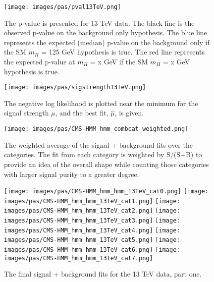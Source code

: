 \begin{figure}[h!]
    \centering
    \texttt{[image: images/pas/pval13TeV.png]}
    \caption[The p-value on the background-only hypothesis using 13 TeV data alone.]
    {The p-value is presented for 13 TeV data. The black line is the observed p-value on the background only hypothesis. The blue line represents the expected (median) p-value on the background only if the SM $m_H$ = 125 GeV hypothesis is true. The red line represents the expected p-value at $m_H$ = x GeV if the SM $m_H$ = x GeV hypothesis is true.}
    \label{fig:pval13}
\end{figure}
\begin{figure}[h!]
    \centering
    \texttt{[image: images/pas/sigstrength13TeV.png]}
    \caption[A plot of the negative log likelihood near the minimum for the signal strength.]
    {The negative log likelihood is plotted near the minimum for the signal strength $\mu$, and the best fit, $\hat{\mu}$, is given.}
    \label{fig:signalstrength13}
\end{figure}
\begin{figure}[h!]
    \centering
    \texttt{[image: images/pas/CMS-HMM\_hmm\_combcat\_weighted.png]}
    \caption[The weighted average of the signal + background fits for 13 TeV data.]
    {The weighted average of the signal + background fits over the categories. The fit from each category is weighted by S/(S+B) to provide an idea of the overall shape while counting those categories with larger signal purity to a greater degree.}
    \label{fig:splusbweight}
\end{figure}
\begin{figure}[h!]
    \centering
    \texttt{[image: images/pas/CMS-HMM\_hmm\_hmm\_13TeV\_cat0.png]}
    \texttt{[image: images/pas/CMS-HMM\_hmm\_hmm\_13TeV\_cat1.png]}
    \texttt{[image: images/pas/CMS-HMM\_hmm\_hmm\_13TeV\_cat2.png]}
    \texttt{[image: images/pas/CMS-HMM\_hmm\_hmm\_13TeV\_cat3.png]}
    \texttt{[image: images/pas/CMS-HMM\_hmm\_hmm\_13TeV\_cat4.png]}
    \texttt{[image: images/pas/CMS-HMM\_hmm\_hmm\_13TeV\_cat5.png]}
    \texttt{[image: images/pas/CMS-HMM\_hmm\_hmm\_13TeV\_cat6.png]}
    \texttt{[image: images/pas/CMS-HMM\_hmm\_hmm\_13TeV\_cat7.png]}
    \caption[Signal + background fits for the individual categories on 13 TeV data.]
    {The final signal + background fits for the 13 TeV data, part one.}
    \label{fig:fitsbycat1}
\end{figure}
